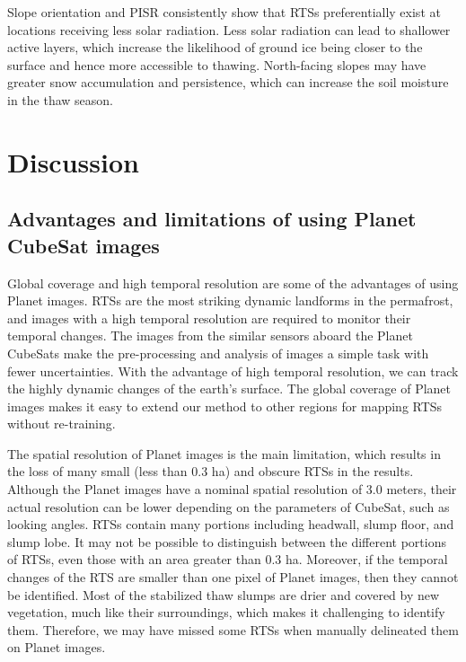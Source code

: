 \documentclass[authoryear,preprint,review,12pt]{elsarticle}
\begin{document}
Slope orientation and PISR consistently show that RTSs preferentially exist at locations receiving less solar radiation. Less solar radiation can lead to shallower active layers, which increase the likelihood of ground ice being closer to the surface and hence more accessible to thawing. North-facing slopes may have greater snow accumulation and persistence, which can increase the soil moisture in the thaw season. 


\section{Discussion}
\label{sec_discussion}

\subsection{Advantages and limitations of using Planet CubeSat images}
\label{subsec_advantage_limitation_planet}

Global coverage and high temporal resolution are some of the advantages of using Planet images. RTSs are the most striking dynamic landforms in the permafrost, and images with a high temporal resolution are required to monitor their temporal changes. The images from the similar sensors aboard the Planet CubeSats make the pre-processing and analysis of images a simple task with fewer uncertainties. With the advantage of high temporal resolution, we can track the highly dynamic changes of the earth's surface. 
The global coverage of Planet images makes it easy to extend our method to other regions for mapping RTSs without re-training. 

The spatial resolution of Planet images is the main limitation, which results in the loss of many small (less than 0.3 ha) and obscure RTSs in the results. Although the Planet images have a nominal spatial resolution of 3.0 meters, their actual resolution can be lower depending on the parameters of CubeSat, such as looking angles.
RTSs contain many portions including headwall, slump floor, and slump lobe. It may not be possible to distinguish between the different portions of RTSs, even those with an area greater than 0.3 ha. Moreover, if the temporal changes of the RTS are smaller than one pixel of Planet images, then they cannot be identified. Most of the stabilized thaw slumps are drier and covered by new vegetation, much like their surroundings, which makes it challenging to identify them. 
Therefore, we may have missed some RTSs when manually delineated them on Planet images.
\end{document}
